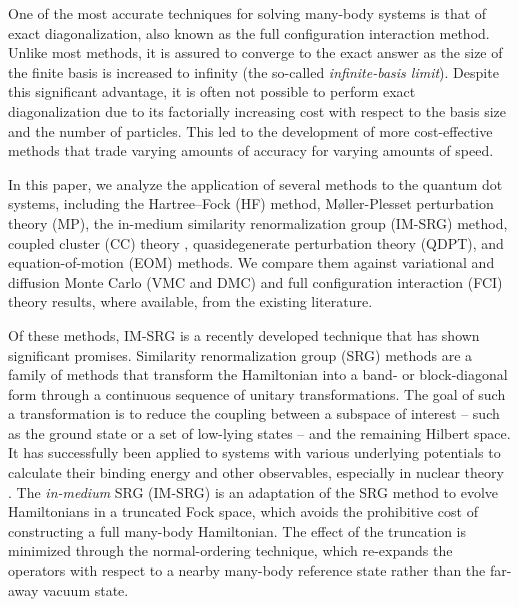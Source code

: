 One of the most accurate techniques for solving many-body systems is that of exact diagonalization, also known as the full configuration interaction method.  Unlike most methods, it is assured to converge to the exact answer as the size of the finite basis is increased to infinity (the so-called \textit{infinite-basis limit}).  Despite this significant advantage, it is often not possible to perform exact diagonalization due to its factorially increasing cost with respect to the basis size and the number of particles.  This led to the development of more cost-effective methods that trade varying amounts of accuracy for varying amounts of speed.

In this paper, we analyze the application of several methods to the quantum dot systems, including the Hartree--Fock (HF) method, M\o ller-Plesset perturbation theory (MP), the in-medium similarity renormalization group (IM-SRG) method, coupled cluster (CC) theory \cite{PhysRevB.67.045320,heidari:114708,PhysRevB.84.115302}, quasidegenerate perturbation theory (QDPT), and equation-of-motion (EOM) methods.  We compare them against variational and diffusion Monte Carlo (VMC and DMC) \cite{PhysRevB.68.035304,PhysRevB.62.8120,PhysRevB.84.115302,PhysRevB.54.4780} and full configuration interaction (FCI) theory \cite{olsen2013thesis,JJAP.36.3924,PhysRevB.56.6428,2008arXiv0810.2644K,rontani:124102} results, where available, from the existing literature.

Of these methods, IM-SRG is a recently developed technique that has shown significant promises.  Similarity renormalization group (SRG) methods are a family of methods that transform the Hamiltonian into a band- or block-diagonal form through a continuous sequence of unitary transformations.  The goal of such a transformation is to reduce the coupling between a subspace of interest -- such as the ground state or a set of low-lying states -- and the remaining Hilbert space.  It has successfully been applied to systems with various underlying potentials to calculate their binding energy and other observables, especially in nuclear theory \cite{ScottSRG,PhysRevC.75.061001,SRGThreeDim}.  The \emph{in-medium} SRG (IM-SRG) is an adaptation of the SRG method to evolve Hamiltonians in a truncated Fock space, which avoids the prohibitive cost of constructing a full many-body Hamiltonian.  The effect of the truncation is minimized through the normal-ordering technique, which re-expands the operators with respect to a nearby many-body reference state rather than the far-away vacuum state.

